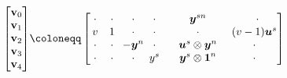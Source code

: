 \begin{figure}[h!]
  \begin{align*}
    \begin{bmatrix}
      \textbf{v}_0 \\
      \textbf{v}_1 \\
      \textbf{v}_2 \\
      \textbf{v}_3 \\
      \textbf{v}_4
      \end{bmatrix}
      &\coloneqq
      \setcounter{MaxMatrixCols}{40}
      \begin{bmatrix}
          \hspace{0.6mm} \cdot & 
          \hspace{0.1mm} \cdot & 
          \hspace{-1mm} \cdot & 
          \hspace{-1.8mm} \cdot & 
          \hspace{2.6mm} \vecnb{y}^{sn} & 
          \hspace{3.2mm} \cdot \\
          \hspace{0.6mm} v & 
          \hspace{0.1mm} 1 & 
          \hspace{-1mm} \cdot & 
          \hspace{-1.8mm} \cdot & 
          \hspace{2.6mm} \cdot & 
          \hspace{1.2mm} (v-1)\vecnb{u}^s\\
          \hspace{0.6mm} \cdot & 
          \hspace{0.1mm} \cdot & 
          \hspace{-1mm} -\vecnb{y}^n & 
          \hspace{-1.8mm} \cdot &
          \hspace{2.6mm} \vecnb{u}^s \otimes \vecnb{y}^n & 
          \hspace{1.2mm} \cdot \\
          \hspace{0.6mm} \cdot & 
          \hspace{0.1mm} \cdot & 
          \hspace{-1mm} \cdot & 
          \hspace{-1.8mm} y^s &
          \hspace{2.6mm} \vecnb{y}^s \otimes \vecnb{1}^n & 
          \hspace{1.2mm} \cdot \\

\end{bmatrix}
\end{align*}
\end{figure}
